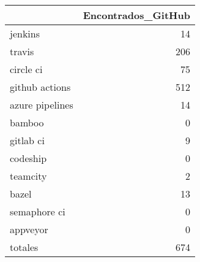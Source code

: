 \begin{tabular}{lr}
\toprule
{} &  Encontrados\_GitHub \\
\midrule
jenkins         &                  14 \\
travis          &                 206 \\
circle ci       &                  75 \\
github actions  &                 512 \\
azure pipelines &                  14 \\
bamboo          &                   0 \\
gitlab ci       &                   9 \\
codeship        &                   0 \\
teamcity        &                   2 \\
bazel           &                  13 \\
semaphore ci    &                   0 \\
appveyor        &                   0 \\
totales         &                 674 \\
\bottomrule
\end{tabular}

